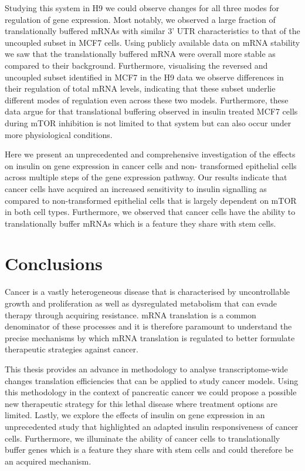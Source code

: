 \documentclass[12pt,openany]{book}
\begin{document}
Studying this system in H9 we could observe changes for all three modes
for regulation of gene expression. Most notably, we observed a large
fraction of translationally buffered mRNAs with similar 3' UTR
characteristics to that of the uncoupled subset in MCF7 cells. Using
publicly available data on mRNA stability we saw that the
translationally buffered mRNA were overall more stable as compared to
their background. Furthermore, visualising the reversed and uncoupled
subset identified in MCF7 in the H9 data we observe differences in their
regulation of total mRNA levels, indicating that these subset underlie
different modes of regulation even across these two models. Furthermore,
these data argue for that translational buffering observed in insulin
treated MCF7 cells during mTOR inhibition is not limited to that system
but can also occur under more physiological conditions.

Here we present an unprecedented and comprehensive investigation of the
effects on insulin on gene expression in cancer cells and non-
transformed epithelial cells across multiple steps of the gene
expression pathway. Our results indicate that cancer cells have acquired
an increased sensitivity to insulin signalling as compared to
non-transformed epithelial cells that is largely dependent on mTOR in
both cell types. Furthermore, we observed that cancer cells have the
ability to translationally buffer mRNAs which is a feature they share
with stem cells.

\chapter{Conclusions}

Cancer is a vastly heterogeneous disease that is characterised by
uncontrollable growth and proliferation as well as dysregulated
metabolism that can evade therapy through acquiring resistance. mRNA
translation is a common denominator of these processes and it is
therefore paramount to understand the precise mechanisms by which mRNA
translation is regulated to better formulate therapeutic strategies
against cancer.

This thesis provides an advance in methodology to analyse
transcriptome-wide changes translation efficiencies that can be applied
to study cancer models. Using this methodology in the context of
pancreatic cancer we could propose a possible new therapeutic strategy
for this lethal disease where treatment options are limited. Lastly, we
explore the effects of insulin on gene expression in an unprecedented
study that highlighted an adapted insulin responsiveness of cancer
cells. Furthermore, we illuminate the ability of cancer cells to
translationally buffer genes which is a feature they share with stem
cells and could therefore be an acquired mechanism.
\end{document}
